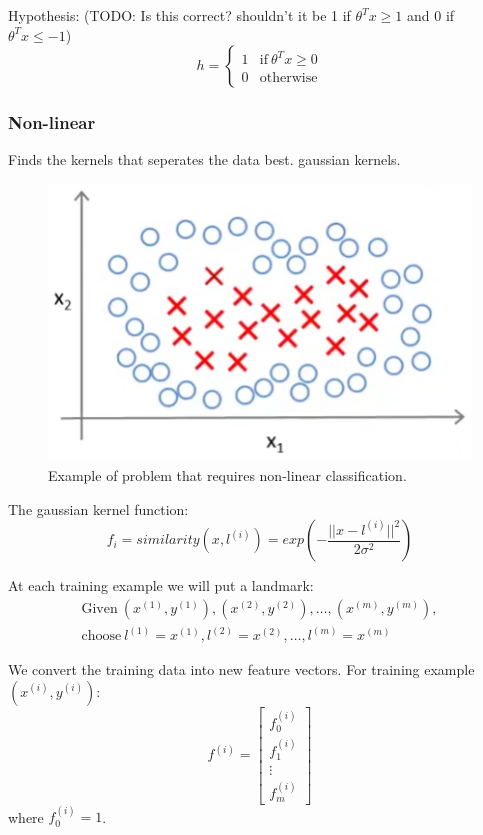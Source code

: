 Hypothesis: (TODO: Is this correct? shouldn't it be 1 if $\theta^Tx \geq 1$ and 0 if $\theta^Tx \leq -1$)
\begin{equation}
h = 
\begin{cases}
1 & \text{if}\ \theta^Tx \geq 0 \\
0 & \text{otherwise}
\end{cases}
\end{equation}

\subsubsection{Non-linear}
Finds the kernels that seperates the data best.
gaussian kernels.

\begin{figure}[H]
\centering
\includegraphics[scale=.75]{billeder/svm-non-linear}
\caption{Example of problem that requires non-linear classification.}
\label{fig:svm-non-linear}
\end{figure}

The gaussian kernel function:
\begin{equation}
f_i = similarity(x,l^{(i)}) =
exp\left(-\frac{||x-l^{(i)}||^2}{2\sigma^2}\right)
\end{equation}

At each training example we will put a landmark:
\begin{equation}
\begin{split}
\text{Given}\ (x^{(1)},y^{(1)}),(x^{(2)},y^{(2)}),\dots,(x^{(m)},y^{(m)}),\\
\text{choose}\ l^{(1)} = x^{(1)},l^{(2)} = x^{(2)},\dots,l^{(m)} = x^{(m)}
\end{split}
\end{equation}

We convert the training data into new feature vectors. For training example $(x^{(i)},y^{(i)})$:
\begin{equation}
f^{(i)}=
\begin{bmatrix}
f_0^{(i)} \\
f_1^{(i)} \\
\vdots \\
f_m^{(i)}
\end{bmatrix}
\end{equation}
 where $f_0^{(i)} = 1$.


